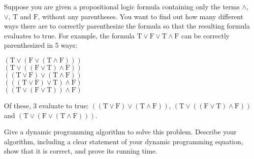 \problem{}
Suppose you are given a propositional logic formula containing only the terms $\land$, $\lor$, $\text{T}$ and $\text{F}$, without any parentheses. You want to find out how many different ways there are to correctly parenthesize the formula so that the resulting formula evaluates to true. For example, the formula $\text{T} \lor \text{F} \lor \text{T} \land \text{F}$ can be correctly parenthesized in 5 ways:
\begin{center}
$(\text{T} \lor (\text{F} \lor (\text{T} \land \text{F})))$ \\
$(\text{T} \lor ((\text{F} \lor \text{T}) \land \text{F}))$ \\
$((\text{T} \lor \text{F}) \lor (\text{T} \land \text{F}))$ \\
$(((\text{T} \lor \text{F}) \lor \text{T}) \land \text{F})$ \\
$((\text{T} \lor (\text{F} \lor \text{T})) \land \text{F})$
\end{center}
Of these, 3 evaluate to true: $((\text{T} \lor \text{F}) \lor (\text{T} \land \text{F}))$, $(\text{T} \lor ((\text{F} \lor \text{T}) \land \text{F}))$ and $(\text{T} \lor (\text{F} \lor (\text{T} \land \text{F})))$.

Give a dynamic programming algorithm to solve this problem. Describe your algorithm, including a clear statement of your dynamic programming equation, show that it is correct, and prove its running time.


\solution{}

\newpage